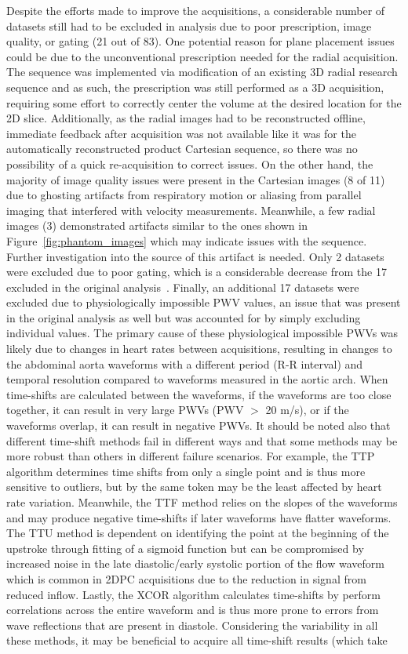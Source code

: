 Despite the efforts made to improve the acquisitions, a considerable number of datasets still had to be excluded in analysis due to poor prescription, image quality, or gating (21 out of 83). One potential reason for plane placement issues could be due to the unconventional prescription needed for the radial acquisition. The sequence was implemented via modification of an existing 3D radial research sequence and as such, the prescription was still performed as a 3D acquisition, requiring some effort to correctly center the volume at the desired location for the 2D slice. Additionally, as the radial images had to be reconstructed offline, immediate feedback after acquisition was not available like it was for the automatically reconstructed product Cartesian sequence, so there was no possibility of a quick re-acquisition to correct issues. On the other hand, the majority of image quality issues were present in the Cartesian images (8 of 11) due to ghosting artifacts from respiratory motion or aliasing from parallel imaging that interfered with velocity measurements. Meanwhile, a few radial images (3) demonstrated artifacts similar to the ones shown in Figure~\ref{fig:phantom_images} which may indicate issues with the sequence. Further investigation into the source of this artifact is needed. Only 2 datasets were excluded due to poor gating, which is a considerable decrease from the 17 excluded in the original analysis~\cite{robertsAdvancingFunctionalAssessment2023}. Finally, an additional 17 datasets were excluded due to physiologically impossible PWV values, an issue that was present in the original analysis as well but was accounted for by simply excluding individual values. The primary cause of these physiological impossible PWVs was likely due to changes in heart rates between acquisitions, resulting in changes to the abdominal aorta waveforms with a different period (R-R interval) and temporal resolution compared to waveforms measured in the aortic arch. When time-shifts are calculated between the waveforms, if the waveforms are too close together, it can result in very large PWVs (PWV $>$ 20 m/s), or if the waveforms overlap, it can result in negative PWVs. It should be noted also that different time-shift methods fail in different ways and that some methods may be more robust than others in different failure scenarios. For example, the TTP algorithm determines time shifts from only a single point and is thus more sensitive to outliers, but by the same token may be the least affected by heart rate variation. Meanwhile, the TTF method relies on the slopes of the waveforms and may produce negative time-shifts if later waveforms have flatter waveforms. The TTU method is dependent on identifying the point at the beginning of the upstroke through fitting of a sigmoid function but can be compromised by increased noise in the late diastolic/early systolic portion of the flow waveform which is common in 2DPC acquisitions due to the reduction in signal from reduced inflow. Lastly, the XCOR algorithm calculates time-shifts by perform correlations across the entire waveform and is thus more prone to errors from wave reflections that are present in diastole. Considering the variability in all these methods, it may be beneficial to acquire all time-shift results (which take 